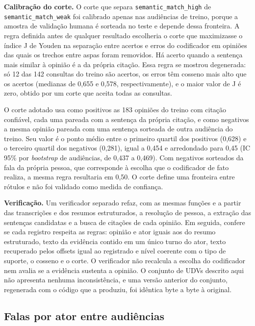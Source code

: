 

\textbf{Calibração do corte.} O corte que separa \texttt{semantic\_match\_high} de
\texttt{semantic\_match\_weak} foi calibrado apenas nas audiências de treino, porque a amostra de
validação humana é sorteada no teste e depende dessa fronteira. A regra definida antes de qualquer
resultado escolheria o corte que maximizasse o índice J de Youden na separação entre acertos e erros
do codificador em opiniões das quais os trechos entre aspas foram removidos. Há acerto quando a
sentença mais similar à opinião é a da própria citação. Essa regra se mostrou
degenerada: só 12 das 142 consultas do treino são acertos, os erros têm cosseno mais alto que os
acertos (medianas de 0,655 e 0,578, respectivamente), e o maior valor de J é zero, obtido por um
corte que aceita todas as consultas.

O corte adotado usa como positivos as 183 opiniões do treino com citação confiável, cada uma pareada
com a sentença da própria citação, e como negativos a mesma opinião pareada com uma sentença sorteada
de outra audiência do treino. Seu valor é o ponto médio entre o primeiro quartil dos positivos
(0,628) e o terceiro quartil dos negativos (0,281), igual a 0,454 e arredondado para 0,45 (IC 95\%
por \textit{bootstrap} de audiências, de 0,437 a 0,469). Com negativos sorteados da fala da própria
pessoa, que corresponde à escolha que o codificador de fato realiza, a mesma regra resultaria em
0,50. O corte define uma fronteira entre rótulos e não foi validado como medida de confiança.

\textbf{Verificação.} Um verificador separado refaz, com as mesmas funções e a partir das transcrições e dos resumos
estruturados, a
resolução de pessoa, a extração das sentenças candidatas e a busca de citações de cada opinião. Em
seguida, confere se cada registro respeita as regras: opinião e ator iguais aos do resumo estruturado, texto da
evidência contido em um único turno do ator, texto recuperado pelos offsets igual ao registrado e
nível coerente com o tipo de suporte, o cosseno e o corte. O verificador não recalcula a escolha do
codificador nem avalia se a evidência sustenta a opinião. O conjunto de UDVs descrito aqui não
apresenta nenhuma inconsistência, e uma versão anterior do conjunto, regenerada com o código que a
produziu, foi idêntica byte a byte à original.

\subsection{Falas por ator entre audiências}
\label{sec:metodo-atores}

